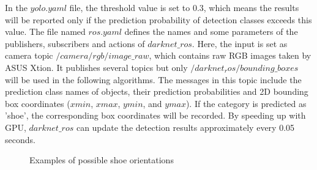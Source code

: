 In the $yolo.yaml$ file, the threshold value is set to 0.3, which means the results will be reported only if the prediction probability of detection classes exceeds this value. The file named $ros.yaml$ defines the names and some parameters of the publishers, subscribers and actions of $darknet\_ros$. Here, the input is set as camera topic $/camera/rgb/image\_raw$, which contains raw RGB images taken by ASUS Xtion. It publishes several topics but only $/darknet_ros/bounding\_boxes$ will be used in the following algorithms. The messages in this topic include the prediction class names of objects, their prediction probabilities and 2D bounding box coordinates ($xmin$, $xmax$, $ymin$, and $ymax$). If the category is predicted as 'shoe', the corresponding box coordinates will be recorded. By speeding up with GPU, $darknet\_ros$ can update the detection results approximately every 0.05 seconds.

\begin{figure}[H]
\centering
{}
\caption{Examples of possible shoe orientations}
\end{figure}

